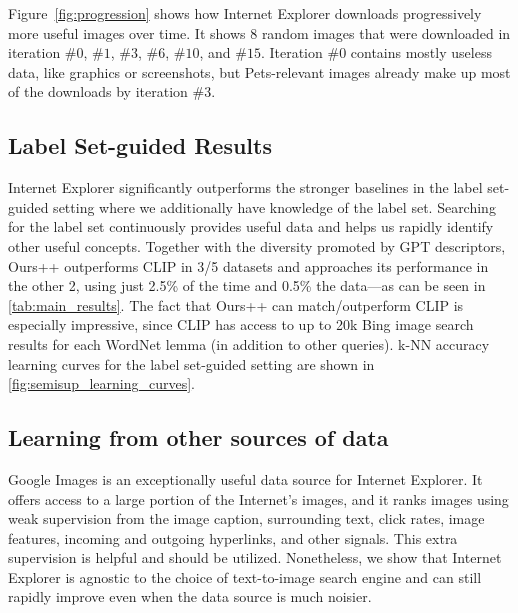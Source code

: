 Figure~\ref{fig:progression} shows how Internet Explorer downloads progressively more useful images over time. It shows 8 random images that were downloaded in iteration $\#0$, $\#1$, $\#3$, $\#6$, $\#10$, and $\#15$. Iteration $\#0$ contains mostly useless data, like graphics or screenshots, but Pets-relevant images already make up most of the downloads by iteration $\#3$. 


\subsection{Label Set-guided Results}
Internet Explorer significantly outperforms the stronger baselines in the label set-guided setting where we additionally have knowledge of the label set. Searching for the label set continuously provides useful data and helps us rapidly identify other useful concepts. Together with the diversity promoted by GPT descriptors, Ours++ outperforms CLIP in 3/5 datasets and approaches its performance in the other 2, using just 2.5\% of the time and 0.5\% the data---as can be seen in \cref{tab:main_results}. The fact that Ours++ can match/outperform CLIP is especially impressive, since CLIP has access to up to 20k Bing image search results for each WordNet lemma (in addition to other queries).
k-NN accuracy learning curves for the label set-guided setting are shown in \cref{fig:semisup_learning_curves}.


\subsection{Learning from other sources of data}
\label{subsec:search_engine_main}

Google Images is an exceptionally useful data source for Internet Explorer. It offers access to a large portion of the Internet's images, and it ranks images using weak supervision from the image caption, surrounding text, click rates, image features, incoming and outgoing hyperlinks, and other signals. This extra supervision is helpful and should be utilized. Nonetheless, we show that Internet Explorer is agnostic to the choice of text-to-image search engine and can still rapidly improve even when the data source is much noisier. 

